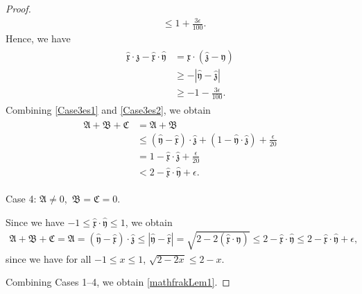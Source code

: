 \documentclass[reqno]{amsart}
\theoremstyle{plain}
\theoremstyle{definition}
\numberwithin{equation}{section}
\begin{document}
\begin{proof}
\begin{align*}
&\leq
1+\frac{3\epsilon}{100}.
\end{align*}
Hence, we have
\begin{align}\label{Case3es2}
\begin{aligned}
\hat{\mathfrak{x}}\cdot\hat{\mathfrak{z}}
-\hat{\mathfrak{x}}\cdot\hat{\mathfrak{y}}
&=
\mathfrak{x}\cdot
\left(\hat{\mathfrak{z}}-\hat{\mathfrak{y}}\right)
\\
&\geq
-\left|\hat{\mathfrak{y}}-\hat{\mathfrak{z}}\right|
\\
&\geq
-1-\frac{3\epsilon}{100}.
\end{aligned}
\end{align}
Combining \eqref{Case3es1} and \eqref{Case3es2}, we obtain
\begin{align}\label{mathfrakCase3}
\begin{aligned}
\mathfrak{A}+\mathfrak{B}+\mathfrak{C}
&=
\mathfrak{A}+\mathfrak{B}
\\
&\leq
\left(\hat{\mathfrak{y}}-\hat{\mathfrak{x}}\right)
\cdot\hat{\mathfrak{z}}
+
\left(1-\hat{\mathfrak{y}}\cdot\hat{\mathfrak{z}}\right)
+\frac{\epsilon}{20}
\\
&=
1-\hat{\mathfrak{x}}\cdot\hat{\mathfrak{z}}
+\frac{\epsilon}{20}
\\
&<
2-\hat{\mathfrak{x}}\cdot\hat{\mathfrak{y}}
+\epsilon.
\end{aligned}
\end{align}


Case 4: $\mathfrak{A}\neq 0$,\ $\mathfrak{B}=\mathfrak{C}=0$.

Since we have $-1\leq \hat{\mathfrak{x}}\cdot \hat{\mathfrak{y}}\leq 1$, we obtain
\begin{align}\label{mathfrakCase4}
\mathfrak{A}+\mathfrak{B}+\mathfrak{C}=\mathfrak{A}=\left(\hat{\mathfrak{y}}-\hat{\mathfrak{x}}\right)\cdot \hat{\mathfrak{z}}\leq \left|\hat{\mathfrak{y}}-\hat{\mathfrak{x}}\right|=\sqrt{2-2\left(\hat{\mathfrak{x}}\cdot \hat{\mathfrak{y}}\right)}\leq 2-\hat{\mathfrak{x}}\cdot \hat{\mathfrak{y}}\leq 2-\hat{\mathfrak{x}}\cdot \hat{\mathfrak{y}}+\epsilon,
\end{align}
since we have for all $-1\leq x\leq 1$, $\sqrt{2-2x}\leq 2-x$.


Combining Cases 1--4, we obtain \eqref{mathfrakLem1}.
\end{proof}
\end{document}
